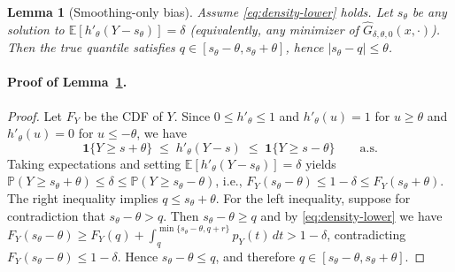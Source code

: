\documentclass{uai2026} %
\theoremstyle{plain}
\newtheorem{lemma}{Lemma}
\theoremstyle{definition}
\begin{document}
\begin{lemma}[Smoothing-only bias]\label{lem:smoothing-bias}
Assume \eqref{eq:density-lower} holds.
Let $s_\theta$ be any solution to $\mathbb{E}[h'_\theta(Y-s_\theta)]=\delta$ (equivalently, any minimizer of $\widehat G_{\delta,\theta,0}(x,\cdot)$).
Then the true quantile satisfies $q\in[s_\theta-\theta,s_\theta+\theta]$, hence $|s_\theta-q|\le \theta$.
\end{lemma}

\paragraph{Proof of Lemma~\ref{lem:smoothing-bias}.}
\begin{proof}
Let $F_Y$ be the CDF of $Y$.
Since $0\le h'_\theta\le 1$ and $h'_\theta(u)=1$ for $u\ge \theta$ and $h'_\theta(u)=0$ for $u\le -\theta$, we have
\[
  \mathbf{1}\{Y\ge s+\theta\}\;\le\; h'_\theta(Y-s)\;\le\;\mathbf{1}\{Y\ge s-\theta\}
  \qquad\text{a.s.}
\]
Taking expectations and setting $\mathbb{E}[h'_\theta(Y-s_\theta)]=\delta$ yields
$\mathbb{P}(Y\ge s_\theta+\theta)\le \delta\le \mathbb{P}(Y\ge s_\theta-\theta)$, i.e.,
$F_Y(s_\theta-\theta)\le 1-\delta\le F_Y(s_\theta+\theta)$.
The right inequality implies $q\le s_\theta+\theta$.
For the left inequality, suppose for contradiction that $s_\theta-\theta>q$.
Then $s_\theta-\theta\ge q$ and by \eqref{eq:density-lower} we have
$F_Y(s_\theta-\theta)\ge F_Y(q) + \int_q^{\min\{s_\theta-\theta,q+r\}} p_Y(t)\,dt > 1-\delta$,
contradicting $F_Y(s_\theta-\theta)\le 1-\delta$.
Hence $s_\theta-\theta\le q$, and therefore $q\in[s_\theta-\theta,s_\theta+\theta]$.
\end{proof}
\end{document}
